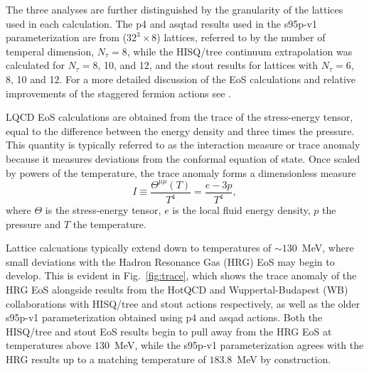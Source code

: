 \documentclass[aps,prc,reprint,amsmath,nofootinbib,superscriptaddress]{revtex4-1}
\begin{document}
The three analyses are further distinguished by the granularity of the lattices used in each calculation.
The p4 and asqtad results used in the s95p-v1 parameterization are from ($32^3 \times 8$) lattices, referred to by the number of temperal dimension, $N_{\tau}=8$, while the HISQ/tree continuum extrapolation was calculated for $N_{\tau}=8$, 10, and 12, and the stout results for lattices with $N_{\tau}=6$, 8, 10 and 12. 
For a more detailed discussion of the EoS calculations and relative improvements of the staggered fermion actions see \cite{Soltz:2015ula}.

LQCD EoS calculations are obtained from the trace of the stress-energy tensor, equal to the difference between the energy density and three times the pressure. 
This quantity is typically referred to as the interaction measure or trace anomaly  because it measures deviations from the conformal equation of state. 
Once scaled by powers of the temperature, the trace anomaly forms a dimensionless measure 
\begin{equation}
 I \equiv \frac{\Theta^{\mu\mu}(T)}{T^4} = \frac{e - 3p}{T^4},
\end{equation}
where $\Theta$ is the stress-energy tensor, $e$ is the local fluid energy density, $p$ the pressure and $T$ the temperature.

Lattice calcuations typically extend down to temperatures of ${\sim}130$~MeV, where small deviations with the Hadron Resonance Gas (HRG) EoS may begin to develop.
This is evident in Fig.~\ref{fig:trace}, which shows the trace anomaly of the HRG EoS alongside results from the HotQCD and Wuppertal-Budapest (WB) collaborations with HISQ/tree and stout actions respectively, as well as the older s95p-v1 parameterization obtained using p4 and asqad actions.  
Both the HISQ/tree and stout EoS results begin to pull away from the HRG EoS at temperatures above $130$~MeV, while the s95p-v1 parameterization agrees with the HRG results up to a matching temperature of $183.8$~MeV by construction.
\end{document}
